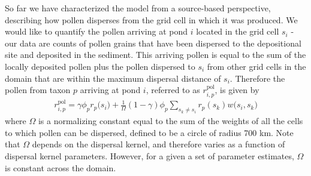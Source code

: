 \documentclass[12pt]{article}
\begin{document}


So far we have characterized the model from a source-based
perspective, describing how pollen disperses from the grid cell in
which it was produced. We would like to quantify the pollen arriving
at pond $i$ located in the grid cell $s_i$ - our data are counts of
pollen grains that have been dispersed to the depositional site and
deposited in the sediment. This arriving pollen is equal to the sum of
the locally deposited pollen plus the pollen dispersed to $s_i$ from
other grid cells in the domain that are within the maximum dispersal
distance of $s_i$. Therefore the pollen from taxon $p$ arriving at
pond $i$, referred to as $r_{i,p}^{\text{pol}}$, is given by
\begin{align}
r_{i,p}^{\text{pol}} = \gamma \phi_p r_p\bigl(s_i\bigr) + \frac{1}{\Omega} (1-\gamma) \phi_p \sum_{s_k \neq s_i } r_p(s_k) w\bigl(s_i, s_k\bigr)
\label{eq:arriving}
\end{align}
where $\Omega$ is a normalizing constant equal to the sum of the
weights of all the cells to which pollen can be dispersed, defined to
be a circle of radius 700 km. Note that $\Omega$ depends on the
dispersal kernel, and therefore varies as a function of dispersal
kernel parameters. However, for a given a set of parameter estimates,
$\Omega$ is constant across the domain.
\end{document}
